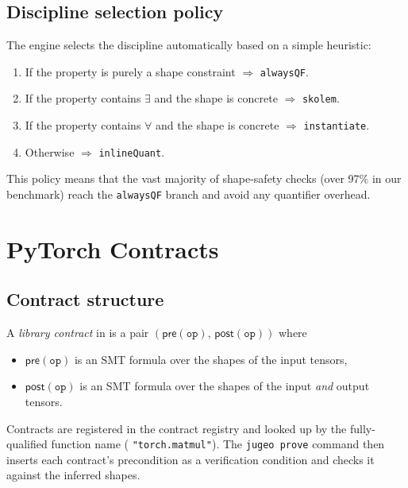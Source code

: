 \documentclass[11pt]{article}
\newcommand{\TPre}[1]{\mathsf{pre}(#1)}            %
\newcommand{\TPost}[1]{\mathsf{post}(#1)}          %
\begin{document}
\subsection{Discipline selection policy}

The \JuGeo{} engine selects the discipline automatically based on a
simple heuristic:

\begin{enumerate}[leftmargin=*]
\item If the property is purely a shape constraint $\Rightarrow$
      \texttt{alwaysQF}.
\item If the property contains $\exists$ and the shape is
      concrete $\Rightarrow$ \texttt{skolem}.
\item If the property contains $\forall$ and the shape is
      concrete $\Rightarrow$ \texttt{instantiate}.
\item Otherwise $\Rightarrow$ \texttt{inlineQuant}.
\end{enumerate}

This policy means that the vast majority of shape-safety checks
(over 97\% in our benchmark) reach the \texttt{alwaysQF} branch
and avoid any quantifier overhead.

\section{PyTorch Contracts}
\label{sec:pytorch}

\subsection{Contract structure}

A \emph{library contract} in \JuGeo{} is a pair
$(\TPre{\mathtt{op}},\, \TPost{\mathtt{op}})$ where
\begin{itemize}
\item $\TPre{\mathtt{op}}$ is an SMT formula over the shapes of the
      input tensors,
\item $\TPost{\mathtt{op}}$ is an SMT formula over the shapes of the
      input \emph{and} output tensors.
\end{itemize}
Contracts are registered in the \JuGeo{} contract registry and looked
up by the fully-qualified function name (\eg
\texttt{"torch.matmul"}).  The \texttt{jugeo prove} command then
inserts each contract's precondition as a verification condition and
checks it against the inferred shapes.
\end{document}
